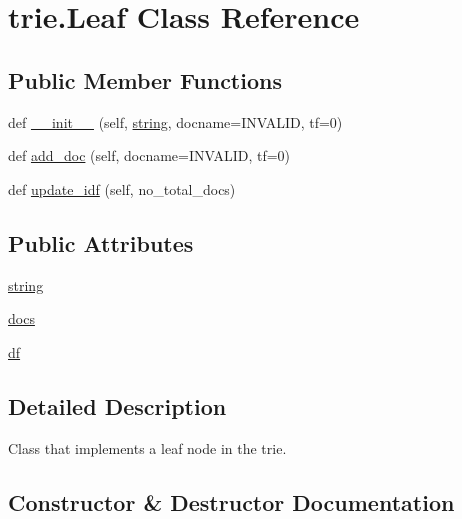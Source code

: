 \hypertarget{classtrie_1_1_leaf}{}\section{trie.\+Leaf Class Reference}
\label{classtrie_1_1_leaf}
\subsection*{Public Member Functions}
\begin{DoxyCompactItemize}
\item 
def \hyperlink{classtrie_1_1_leaf_a94532c800b40efc2149253b17ec0c4bb}{\+\_\+\+\_\+init\+\_\+\+\_\+} (self, \hyperlink{classtrie_1_1_leaf_aeb8d812870e35169f236b42e2eaafb3c}{string}, docname=\textquotesingle{}I\+N\+V\+A\+L\+ID\textquotesingle{}, tf=0)
\item 
def \hyperlink{classtrie_1_1_leaf_a12744c5a7b2adc68b9c5db1d98d19043}{add\+\_\+doc} (self, docname=\textquotesingle{}I\+N\+V\+A\+L\+ID\textquotesingle{}, tf=0)
\item 
def \hyperlink{classtrie_1_1_leaf_aaa23c1a673b7551a8ad04a56dcc50bbc}{update\+\_\+idf} (self, no\+\_\+total\+\_\+docs)
\end{DoxyCompactItemize}
\subsection*{Public Attributes}
\begin{DoxyCompactItemize}
\item 
\hyperlink{classtrie_1_1_leaf_aeb8d812870e35169f236b42e2eaafb3c}{string}
\item 
\hyperlink{classtrie_1_1_leaf_a9066db1d4e05860a45c113e9b611c90b}{docs}
\item 
\hyperlink{classtrie_1_1_leaf_ac6a1252426caf3b28952fc9f958b65ad}{df}
\end{DoxyCompactItemize}


\subsection{Detailed Description}
\begin{DoxyVerb}Class that implements a leaf node in the trie.
\end{DoxyVerb}
 

\subsection{Constructor \& Destructor Documentation}
